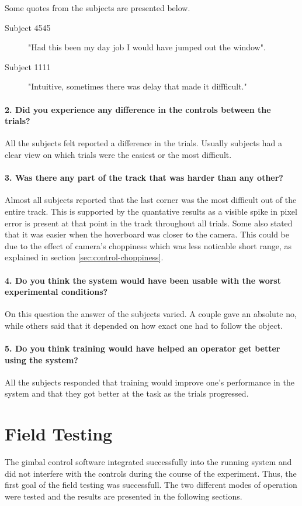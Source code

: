 \documentclass[nofilelist]{cslthse-msc}
\begin{document}
Some quotes from the subjects are presented below.
\begin{description}
   \item[Subject 4545] "Had this been my day job I would have jumped out the window". 
   \item[Subject 1111] "Intuitive, sometimes there was delay that made it diffficult."
\end{description}

\paragraph{2. Did you experience any difference in the controls between the trials?}
All the subjects felt reported a difference in the trials. Usually subjects had a clear view on which trials were the easiest or the most difficult.

\paragraph{3. Was there any part of the track that was harder than any other?}
Almost all subjects reported that the last corner was the most difficult out of the entire track. This is supported by the quantative results as a visible spike in pixel error is present at that point in the track throughout all trials.
Some also stated that it was easier when the hoverboard was closer to the camera. This could be due to the effect of camera's choppiness which was less noticable short range, as explained in section \ref{sec:control-choppiness}.

\paragraph{4. Do you think the system would have been usable with the worst experimental conditions?}
On this question the answer of the subjects varied. A couple gave an absolute no, while others said that it depended on how exact one had to follow the object. 

\paragraph{5. Do you think training would have helped an operator get better using the system?}
All the subjects responded that training would improve one's performance in the system and that they got better at the task as the trials progressed. 

\section{Field Testing}
The gimbal control software integrated successfully into the running system and did not interfere with the controls during the course of the experiment. Thus, the first goal of the field testing was successfull. 
The two different modes of operation were tested and the results are presented in the following sections.
\end{document}
